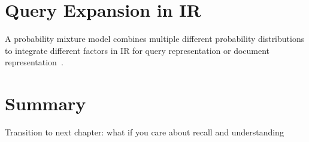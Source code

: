 \begin{comment}
The second approach that \cite{song-99} proposed is to expand a document model with the corpus model, which is very similar to the idea in \cite{PonteCroft}, except that they are using a weighted sum and a weight $w$ can be learned,
\begin{align}
p(t|d) = w \times p_{document}(t|d) + (1-w) \times p_{corpus}(t)
\end{align}

\cite{song-99} further propose to combine unigrams and bigrams to further smooth the probability,
\begin{align}
p(t_{i-1},t_i|d) = w \times p_1(t_i|d) + (1-w) \times p_2(t_{i-1},t_i | d)
\end{align}
which can be further extended to include trigrams as well.
\end{comment}







\section{Query Expansion in IR}

A probability mixture model combines multiple different probability distributions to integrate different factors in IR for query representation or document representation~\citep{miller-99,zhai-01,liu-04}.


\section{Summary}

Transition to next chapter: what if you care about recall and understanding




